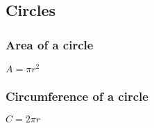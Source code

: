 
\subsection{Circles}

\subsubsection{Area of a circle}

\(A=\pi r^2\)

\subsubsection{Circumference of a circle}

\(C=2\pi r\)

